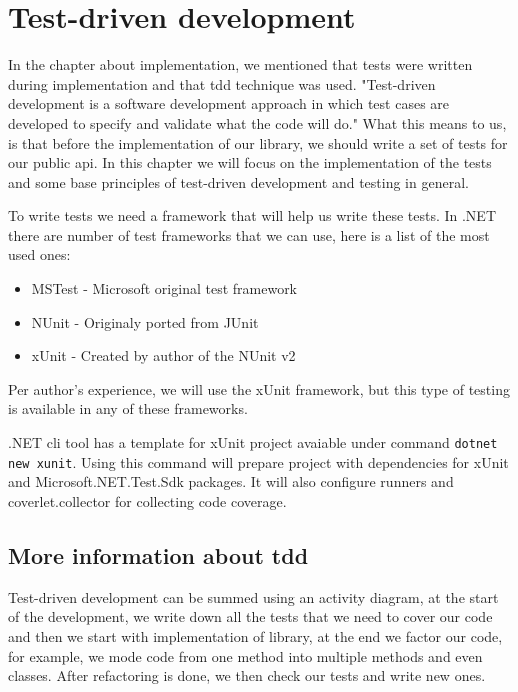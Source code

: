 \chapter {Test-driven development}

In the chapter about implementation, we mentioned that tests were written during implementation and that \acrshort{tdd}
technique was used. "Test-driven development is a software development approach in which test cases are developed to specify
and validate what the code will do." \cite{hamilton_what_2020} What this means to us, is that before the implementation of
our library, we should write a set of tests for our public \acrshort{api}. In this chapter we will focus on the implementation of the tests
and some base principles of test-driven development and testing in general.

To write tests we need a framework that will help us write these tests. In .NET there are number of test frameworks that we can use, here is a list of
the most used ones:

\begin{itemize}
    \item {MSTest - Microsoft original test framework}
    \item {NUnit - Originaly ported from JUnit \cite{noauthor_nunitorg_nodate}}
    \item {xUnit - Created by author of the NUnit v2 \cite{noauthor_home_nodate}}
\end{itemize}

Per author's experience, we will use the xUnit framework, but this type of testing is available in any of these frameworks.

.NET \acrshort{cli} tool has a template for xUnit project avaiable under command \texttt{dotnet new xunit}. Using this command will
prepare project with dependencies for xUnit and Microsoft.NET.Test.Sdk packages. It will also configure runners and coverlet.collector for collecting
code coverage.

\section{More information about \acrshort{tdd}}

Test-driven development can be summed using an activity diagram, at the start of the development, we write down all the tests that we need to cover our code
and then we start with implementation of library, at the end we factor our code, for example, we mode code from one method into multiple methods and even classes.
After refactoring is done, we then check our tests and write new ones.

